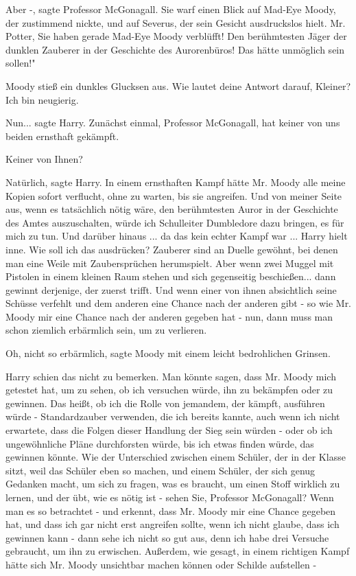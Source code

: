 \glqq{}Aber -\grqq{}, sagte Professor McGonagall. Sie warf einen Blick auf
Mad-Eye Moody, der zustimmend nickte, und auf Severus, der sein Gesicht
ausdruckslos hielt. \glqq{}Mr. Potter, Sie haben gerade Mad-Eye Moody verblüfft!
Den berühmtesten Jäger der dunklen Zauberer in der Geschichte des Aurorenbüros!
Das hätte unmöglich sein sollen!"

Moody stieß ein dunkles Glucksen aus. \glqq{}Wie lautet deine Antwort darauf,
Kleiner? Ich bin neugierig.\grqq{}

\glqq{}Nun...\grqq{} sagte Harry. \glqq{}Zunächst einmal, Professor McGonagall,
hat keiner von uns beiden ernsthaft gekämpft.\grqq{}

\glqq{}Keiner von Ihnen?\grqq{}

\glqq{}Natürlich\grqq{}, sagte Harry. \glqq{}In einem ernsthaften Kampf hätte Mr.
Moody alle meine Kopien sofort verflucht, ohne zu warten, bis sie angreifen. Und
von meiner Seite aus, wenn es tatsächlich nötig wäre, den berühmtesten Auror in
der Geschichte des Amtes auszuschalten, würde ich Schulleiter Dumbledore dazu
bringen, es für mich zu tun. Und darüber hinaus ... da das kein echter Kampf war
...\grqq{} Harry hielt inne. \glqq{}Wie soll ich das ausdrücken? Zauberer sind an
Duelle gewöhnt, bei denen man eine Weile mit Zaubersprüchen herumspielt. Aber
wenn zwei Muggel mit Pistolen in einem kleinen Raum stehen und sich gegenseitig
beschießen... dann gewinnt derjenige, der zuerst trifft. Und wenn einer von
ihnen absichtlich seine Schüsse verfehlt und dem anderen eine Chance nach der
anderen gibt - so wie Mr. Moody mir eine Chance nach der anderen gegeben hat -
nun, dann muss man schon ziemlich erbärmlich sein, um zu verlieren.\grqq{}

\glqq{}Oh, nicht so erbärmlich\grqq{}, sagte Moody mit einem leicht bedrohlichen
Grinsen.

Harry schien das nicht zu bemerken. \glqq{}Man könnte sagen, dass Mr. Moody mich
getestet hat, um zu sehen, ob ich versuchen würde, ihn zu bekämpfen oder zu
gewinnen. Das heißt, ob ich die Rolle von jemandem, der kämpft, ausführen würde
- Standardzauber verwenden, die ich bereits kannte, auch wenn ich nicht
erwartete, dass die Folgen dieser Handlung der Sieg sein würden - oder ob ich
ungewöhnliche Pläne durchforsten würde, bis ich etwas finden würde, das gewinnen
könnte. Wie der Unterschied zwischen einem Schüler, der in der Klasse sitzt,
weil das Schüler eben so machen, und einem Schüler, der sich genug Gedanken
macht, um sich zu fragen, was es braucht, um einen Stoff wirklich zu lernen, und
der übt, wie es nötig ist - sehen Sie, Professor McGonagall? Wenn man es so
betrachtet - und erkennt, dass Mr. Moody mir eine Chance gegeben hat, und dass
ich gar nicht erst angreifen sollte, wenn ich nicht glaube, dass ich gewinnen
kann - dann sehe ich nicht so gut aus, denn ich habe drei Versuche gebraucht, um
ihn zu erwischen. Außerdem, wie gesagt, in einem richtigen Kampf hätte sich Mr.
Moody unsichtbar machen können oder Schilde aufstellen -\grqq{}

